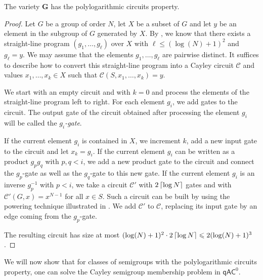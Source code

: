 \documentclass{toc}
\renewcommand{\leq}{\leqslant}
\renewcommand{\le}{\leq}
\newcommand{\ceil}[1]{\ensuremath\left\lceil#1\right\rceil}
\newcommand{\qAC}{\ensuremath{\mathsf{qAC}}}
\newcommand{\vG}{\mathbf{G}}
\renewcommand{\C}{\ensuremath{\mathcal{C}}}
\newcommand{\SCSM}{Cayley semigroup membership}
\newcommand{\SCSMP}{{\SCSM} problem}
\newcommand{\SPLCP}{polylogarithmic circuits property}
\begin{document}
\begin{lemma}
  The variety $\vG$ has the {\SPLCP}.
  \label{lem:groups}
\end{lemma}
%
\begin{proof}
  Let $G$ be a group of order $N$, let $X$ be a subset of $G$ and let $y$ be an
  element in the subgroup of $G$ generated by $X$.
  By , we know that there exists a straight-line
  program $(g_1, \dots, g_\ell)$ over $X$ with $\ell \le (\log(N) + 1)^2$ and
  $g_\ell = y$.
  We may assume that the elements $g_1, \dots, g_\ell$ are pairwise distinct.
  It suffices to describe how to convert this straight-line program into a
  Cayley circuit $\C$ and values $x_1, \dots, x_k \in X$ such that $\C(S, x_1,
  \dots, x_k) = y$.

  We start with an empty circuit and with $k = 0$ and process the elements of
  the straight-line program left to right. For each element $g_i$, we add gates
  to the circuit. The output gate of the circuit obtained after processing the
  element $g_i$ will be called the \emph{$g_i$-gate}.

  If the current element $g_i$ is contained in $X$, we increment $k$, add a new
  input gate to the circuit and let $x_k = g_i$.
  If the current element $g_i$ can be written as a product $g_p g_q$ with
  $p, q < i$, we add a new product gate to the circuit and connect the
  $g_p$-gate as well as the $g_q$-gate to this new gate.
  If the current element $g_i$ is an inverse $g_p^{-1}$ with $p < i$, we take a
  circuit $\C'$ with $2\ceil{\log N}$ gates and with $\C'(G, x) = x^{N-1}$ for
  all $x \in S$.
  Such a circuit can be built by using the powering technique illustrated in
  .
  We add $\C'$ to $\C$, replacing its input gate
  by an edge coming from the $g_p$-gate.

  The resulting circuit has size at most $(\log(N) + 1)^2 \cdot 2\ceil{\log N}
  \le 2(\log(N) + 1)^3$.
\end{proof}

We will now show that for classes of semigroups with the {\SPLCP}, one can
solve the {\SCSMP} in $\qAC^0$.
\end{document}
